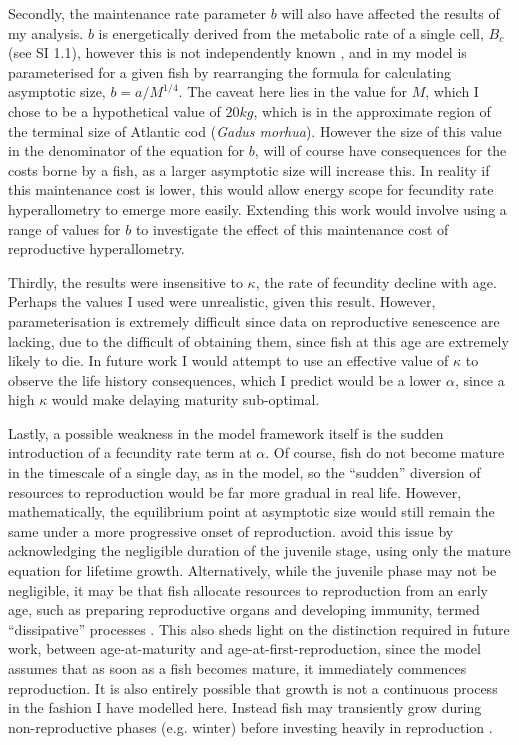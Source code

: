 \documentclass[a4paper]{article} %
\begin{document}
Secondly, the maintenance rate parameter $b$ will also have affected the results of my analysis. $b$ is energetically derived from the metabolic rate of a single cell, $B_c$ (see SI 1.1), however this is not independently known \autocite{West2001}, and in my model is parameterised for a given fish by rearranging the formula for calculating asymptotic size, $b = a/M^{1/4}$. The caveat here lies in the value for $M$, which I chose to be a hypothetical value of $20kg$, which is in the approximate region of the terminal size of Atlantic cod (\textit{Gadus morhua}). However the size of this value in the denominator of the equation for $b$, will of course have consequences for the costs borne by a fish, as a larger asymptotic size will increase this. In reality if this maintenance cost is lower, this would allow energy scope for fecundity rate hyperallometry to emerge more easily. Extending this work would involve using a range of values for $b$ to investigate the effect of this maintenance cost of reproductive hyperallometry.

Thirdly, the results were insensitive to $\kappa$, the rate of fecundity decline with age. Perhaps the values I used were unrealistic, given this result. However, parameterisation is extremely difficult since data on reproductive senescence are lacking, due to the difficult of obtaining them, since fish at this age are extremely likely to die. In future work I would attempt to use an effective value of $\kappa$ to observe the life history consequences, which I predict would be a lower $\alpha$, since a high $\kappa$ would make delaying maturity sub-optimal.

Lastly, a possible weakness in the model framework itself is the sudden introduction of a fecundity rate term at $\alpha$. Of course, fish do not become mature in the timescale of a single day, as in the model, so the ``sudden'' diversion of resources to reproduction would be far more gradual in real life. However, mathematically, the equilibrium point at asymptotic size would still remain the same under a more progressive onset of reproduction. \textcite{West2001} avoid this issue by acknowledging the negligible duration of the juvenile stage, using only the mature equation for lifetime growth. Alternatively, while the juvenile phase may not be negligible, it may be that fish allocate resources to reproduction from an early age, such as preparing reproductive organs and developing immunity, termed ``dissipative'' processes \autocite{kooijman2010dynamic, Kearney2012a}. This also sheds light on the distinction required in future work, between age-at-maturity and age-at-first-reproduction, since the model assumes that as soon as a fish becomes mature, it immediately commences reproduction. It is also entirely possible that growth is not a continuous process in the fashion I have modelled here. Instead fish may transiently grow during non-reproductive phases (e.g. winter) before investing heavily in reproduction \autocite{Kozowski1987-indeterminate}.
\end{document}
